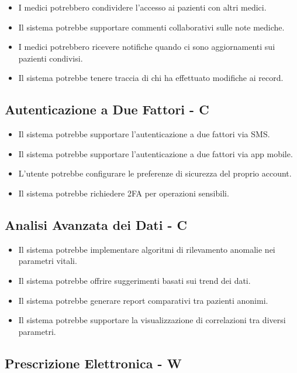 \documentclass[12pt,a4paper,oneside]{report}
\begin{document}
\begin{itemize}
    \item I medici potrebbero condividere l'accesso ai pazienti con altri medici.
    \item Il sistema potrebbe supportare commenti collaborativi sulle note mediche.
    \item I medici potrebbero ricevere notifiche quando ci sono aggiornamenti sui pazienti condivisi.
    \item Il sistema potrebbe tenere traccia di chi ha effettuato modifiche ai record.
\end{itemize}

\subsection{Autenticazione a Due Fattori  - C}

\begin{itemize}
    \item Il sistema potrebbe supportare l'autenticazione a due fattori via SMS.
    \item Il sistema potrebbe supportare l'autenticazione a due fattori via app mobile.
    \item L'utente potrebbe configurare le preferenze di sicurezza del proprio account.
    \item Il sistema potrebbe richiedere 2FA per operazioni sensibili.
\end{itemize}

\subsection{Analisi Avanzata dei Dati  - C}

\begin{itemize}
    \item Il sistema potrebbe implementare algoritmi di rilevamento anomalie nei parametri vitali.
    \item Il sistema potrebbe offrire suggerimenti basati sui trend dei dati.
    \item Il sistema potrebbe generare report comparativi tra pazienti anonimi.
    \item Il sistema potrebbe supportare la visualizzazione di correlazioni tra diversi parametri.
\end{itemize}

\subsection{Prescrizione Elettronica - W}
\end{document}
